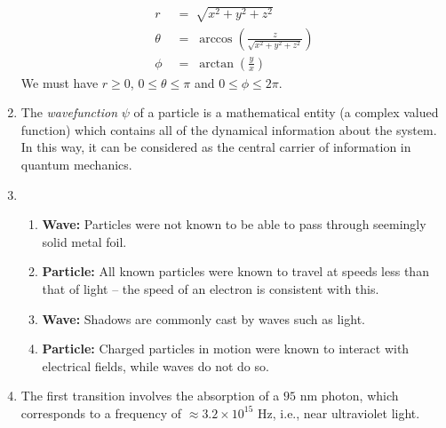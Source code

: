 \documentclass[10pt]{article}
\begin{document}
\begin{enumerate}
\begin{center}
                        \end{center}
                        \begin{align*}
                                r \;&=\; \sqrt{x^2 + y^2 + z^2} \\
                                \theta \;&=\; \arccos\left( \frac{z}{\sqrt{x^2 + y^2 + z^2}}\right) \\
                                \phi \;&=\; \arctan\left(\frac{y}{x}\right)
                        \end{align*}
                        We must have $r \geq 0$, $0\leq\theta\leq\pi$ and $0\leq\phi\leq 2\pi$.
                \item The \textit{wavefunction} $\psi$ of a particle is a mathematical entity (a complex valued function) which contains
                all of the dynamical information about the system. In this way, it can be considered as the central carrier of
                information in quantum mechanics.

                \item
                \begin{enumerate}
                        \item \textbf{Wave:} Particles were not known to be able to pass through seemingly solid metal foil.
                        \item \textbf{Particle:} All known particles were known to travel at speeds less than that of light --
                                the speed of an electron is consistent with this.
                        \item \textbf{Wave:} Shadows are commonly cast by waves such as light.
                        \item \textbf{Particle:} Charged particles in motion were known to interact with electrical fields,
                                while waves do not do so.
                \end{enumerate} 
                \item The first transition involves the absorption of a $95 \text{ nm}$ photon, which corresponds to 
                a frequency of $\approx 3.2 \times 10^{15} \text{ Hz}$, i.e., near ultraviolet light.


\end{enumerate}
\end{document}
